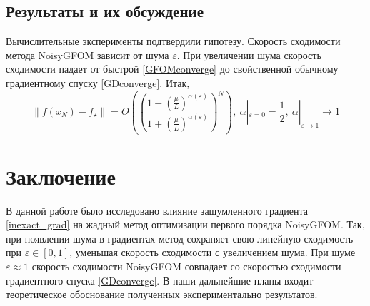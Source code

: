 \documentclass{article}
\begin{document}
\subsection{Результаты и их обсуждение}

Вычислительные эксперименты подтвердили гипотезу. Скорость сходимости метода NoisyGFOM зависит от шума $\varepsilon$. При увеличении шума скорость сходимости падает от быстрой \ref{GFOMconverge} до свойственной обычному градиентному спуску \ref{GDconverge}. Итак, 
\begin{equation}\label{NoisyGFOMconverge}
   \|f(x_N) - f_{\star}\| = O\left(\left(\frac{1 - \left(\frac{\mu}{L}\right)^{\alpha(\varepsilon)}}{1 + \left(\frac{\mu}{L}\right)^{\alpha(\varepsilon)}}\right)^N\right),  \
   \alpha|_{\varepsilon = 0} = \frac12, \ \alpha|_{\varepsilon \rightarrow 1} \rightarrow 1
\end{equation}

\section{Заключение}
В данной работе было исследовано влияние зашумленного градиента \ref{inexact_grad} на жадный метод оптимизации первого порядка NoisyGFOM. Так, при появлении шума в градиентах метод сохраняет свою линейную сходимость при $\varepsilon \in [0,1]$, уменьшая скорость сходимости с увеличением шума. При шуме $\varepsilon \approx 1$ скорость сходимости NoisyGFOM совпадает со скоростью сходимости градиентного спуска \ref{GDconverge}.
В наши дальнейшие планы входит теоретическое обоснование полученных экспериментально результатов.
\end{document}
